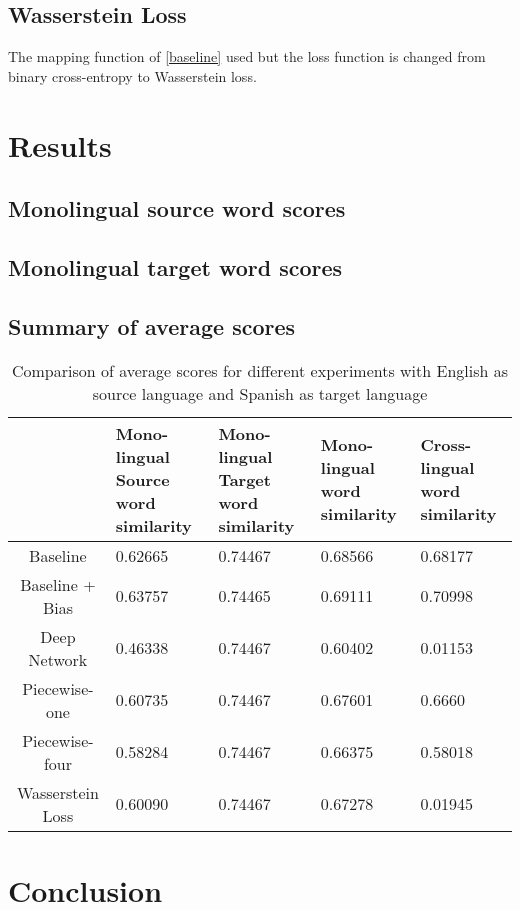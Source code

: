 \documentclass[11pt]{article}
\begin{document}
\subsection{Wasserstein Loss}
The mapping function of \ref{baseline} used but the loss function is changed from binary cross-entropy to Wasserstein loss.

\section{Results}
\subsection{Monolingual source word scores}

\subsection{Monolingual target word scores}

\subsection{Summary of average scores}
\begin{table*}[ht]
  \begin{center}
  \begin{tabular}{|c|l|l|l|l|}
  \hline
   & \multicolumn{1}{|p{3cm}|}{Mono-lingual Source word similarity}& \multicolumn{1}{|p{3cm}|}{Mono-lingual Target word similarity} & \multicolumn{1}{|p{3cm}|}{Mono-lingual word similarity} & \multicolumn{1}{|p{3cm}|}{Cross-lingual word similarity} \\
  \hline
  Baseline & 0.62665 & 0.74467 & 0.68566 & 0.68177  \\
  \hline
  Baseline + Bias & 0.63757 & 0.74465 & 0.69111 & 0.70998 \\
  \hline
  Deep Network & 0.46338 & 0.74467 & 0.60402 & 0.01153 \\
  \hline
  Piecewise-one & 0.60735 & 0.74467 & 0.67601 & 0.6660 \\
  \hline
  Piecewise-four & 0.58284 & 0.74467 & 0.66375 & 0.58018 \\
  \hline
  Wasserstein Loss & 0.60090 & 0.74467 & 0.67278 & 0.01945 \\
  \hline
  \end{tabular}
  \end{center}
  \caption{ Comparison of average scores for different experiments with English as source language and Spanish as target language}
  \label{summary-table}
\end{table*}

\section{Conclusion}





\end{document}
